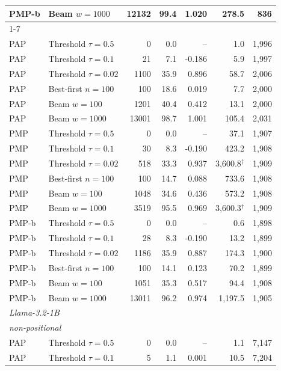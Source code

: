 \documentclass[11pt,a4paper]{article}
\begin{document}
\begin{table}[h]
\begin{tabular}{llrrrrr}
\quad PMP-b & Beam $w{=}1000$ & 12132 & 99.4 & 1.020 & 278.5 & 836 \\
\cmidrule(l){1-7}
\multicolumn{7}{l}{\quad\itshape positional} \\
\quad PAP & Threshold $\tau{=}0.5$ & 0 & 0.0 & -- & 1.0 & 1,996 \\
\quad PAP & Threshold $\tau{=}0.1$ & 21 & 7.1 & -0.186 & 5.9 & 1,997 \\
\quad PAP & Threshold $\tau{=}0.02$ & 1100 & 35.9 & 0.896 & 58.7 & 2,006 \\
\quad PAP & Best-first $n{=}100$ & 100 & 18.6 & 0.019 & 7.7 & 2,000 \\
\quad PAP & Beam $w{=}100$ & 1201 & 40.4 & 0.412 & 13.1 & 2,000 \\
\quad PAP & Beam $w{=}1000$ & 13001 & 98.7 & 1.001 & 105.4 & 2,031 \\
\quad PMP & Threshold $\tau{=}0.5$ & 0 & 0.0 & -- & 37.1 & 1,907 \\
\quad PMP & Threshold $\tau{=}0.1$ & 30 & 8.3 & -0.190 & 423.2 & 1,908 \\
\quad PMP & Threshold $\tau{=}0.02$ & 518 & 33.3 & 0.937 & 3,600.8$^{\dagger}$ & 1,909 \\
\quad PMP & Best-first $n{=}100$ & 100 & 14.7 & 0.088 & 733.6 & 1,908 \\
\quad PMP & Beam $w{=}100$ & 1048 & 34.6 & 0.436 & 573.2 & 1,908 \\
\quad PMP & Beam $w{=}1000$ & 3519 & 95.5 & 0.969 & 3,600.3$^{\dagger}$ & 1,909 \\
\quad PMP-b & Threshold $\tau{=}0.5$ & 0 & 0.0 & -- & 0.6 & 1,898 \\
\quad PMP-b & Threshold $\tau{=}0.1$ & 28 & 8.3 & -0.190 & 13.2 & 1,899 \\
\quad PMP-b & Threshold $\tau{=}0.02$ & 1186 & 35.9 & 0.887 & 174.3 & 1,900 \\
\quad PMP-b & Best-first $n{=}100$ & 100 & 14.1 & 0.123 & 70.2 & 1,899 \\
\quad PMP-b & Beam $w{=}100$ & 1051 & 35.3 & 0.517 & 94.4 & 1,908 \\
\quad PMP-b & Beam $w{=}1000$ & 13011 & 96.2 & 0.974 & 1,197.5 & 1,905 \\
\midrule
\multicolumn{7}{l}{\itshape Llama-3.2-1B} \\
\multicolumn{7}{l}{\quad\itshape non-positional} \\
\quad PAP & Threshold $\tau{=}0.5$ & 0 & 0.0 & -- & 1.1 & 7,147 \\
\quad PAP & Threshold $\tau{=}0.1$ & 5 & 1.1 & 0.001 & 10.5 & 7,204 \\

\end{tabular}
\end{table}
\end{document}
